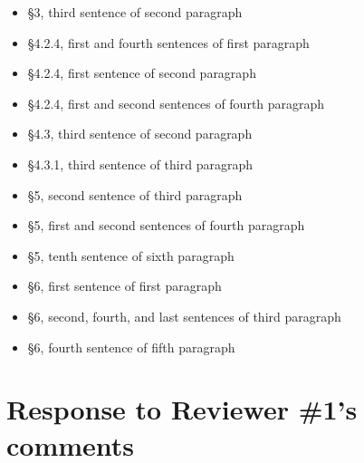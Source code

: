 \documentclass[11pt,letterpaper]{report}
\begin{document}
\begin{enumerate}[label=\textit{Mc.\arabic*}]
\begin{enumerate}[label=\textit{Mc.4.\roman*}]
\begin{itemize}
        \item \S3, third sentence of second paragraph
        \item \S4.2.4, first and fourth sentences of first paragraph
        \item \S4.2.4, first sentence of second paragraph
        \item \S4.2.4, first and second sentences of fourth paragraph
        \item \S4.3, third sentence of second paragraph
        \item \S4.3.1, third sentence of third paragraph
        \item \S5, second sentence of third paragraph
        \item \S5, first and second sentences of fourth paragraph
        \item \S5, tenth sentence of sixth paragraph
        \item \S6, first sentence of first paragraph
        \item \S6, second, fourth, and last sentences of third paragraph
        \item \S6, fourth sentence of fifth paragraph

    \end{itemize}

\end{enumerate}


\end{enumerate}

\clearpage
\section*{Response to Reviewer \#1's comments}
\label{rev1}
\end{document}
